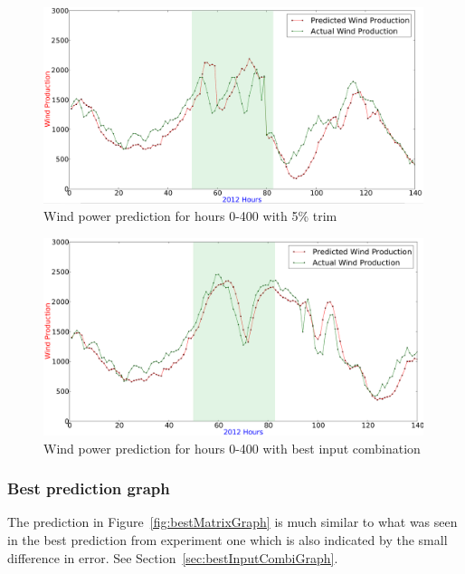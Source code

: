 \begin{figure}[H]
\centering
\includegraphics[width=0.99\textwidth]{billeder/fivePercentTrimPrediction.png}
\caption{Wind power prediction for hours 0-400 with 5\% trim}
\label{fig:fivePercentTrimPrediction}
\end{figure} 

\begin{figure}[H]
\centering
\includegraphics[width=0.99\textwidth]{billeder/bestInputPredictFrom0-400.png}
\caption{Wind power prediction for hours 0-400 with best input combination}
\label{fig:bestInputPredictFrom0-400}
\end{figure} 

\subsubsection{Best prediction graph}
The prediction in Figure~\ref{fig:bestMatrixGraph} is much similar to what was seen in the best prediction from experiment one which is also indicated by the small difference in error. See Section~\ref{sec:bestInputCombiGraph}. 

